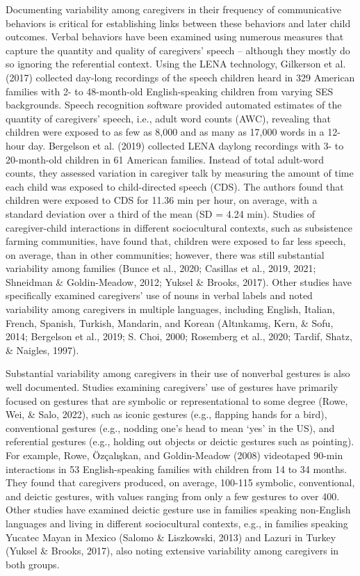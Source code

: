\documentclass[
  man,mask,floatsintext]{apa6}
\begin{document}
Documenting variability among caregivers in their frequency of communicative behaviors is critical for establishing links between these behaviors and later child outcomes. Verbal behaviors have been examined using numerous measures that capture the quantity and quality of caregivers' speech -- although they mostly do so ignoring the referential context. Using the LENA technology, Gilkerson et al. (2017) collected day-long recordings of the speech children heard in 329 American families with 2- to 48-month-old English-speaking children from varying SES backgrounds. Speech recognition software provided automated estimates of the quantity of caregivers' speech, i.e., adult word counts (AWC), revealing that children were exposed to as few as 8,000 and as many as 17,000 words in a 12-hour day. Bergelson et al. (2019) collected LENA daylong recordings with 3- to 20-month-old children in 61 American families. Instead of total adult-word counts, they assessed variation in caregiver talk by measuring the amount of time each child was exposed to child-directed speech (CDS). The authors found that children were exposed to CDS for 11.36 min per hour, on average, with a standard deviation over a third of the mean (SD = 4.24 min). Studies of caregiver-child interactions in different sociocultural contexts, such as subsistence farming communities, have found that, children were exposed to far less speech, on average, than in other communities; however, there was still substantial variability among families (Bunce et al., 2020; Casillas et al., 2019, 2021; Shneidman \& Goldin-Meadow, 2012; Yuksel \& Brooks, 2017). Other studies have specifically examined caregivers' use of nouns in verbal labels and noted variability among caregivers in multiple languages, including English, Italian, French, Spanish, Turkish, Mandarin, and Korean (Altınkamış, Kern, \& Sofu, 2014; Bergelson et al., 2019; S. Choi, 2000; Rosemberg et al., 2020; Tardif, Shatz, \& Naigles, 1997).

Substantial variability among caregivers in their use of nonverbal gestures is also well documented. Studies examining caregivers' use of gestures have primarily focused on gestures that are symbolic or representational to some degree (Rowe, Wei, \& Salo, 2022), such as iconic gestures (e.g., flapping hands for a bird), conventional gestures (e.g., nodding one's head to mean `yes' in the US), and referential gestures (e.g., holding out objects or deictic gestures such as pointing). For example, Rowe, Özçalışkan, and Goldin-Meadow (2008) videotaped 90-min interactions in 53 English-speaking families with children from 14 to 34 months. They found that caregivers produced, on average, 100-115 symbolic, conventional, and deictic gestures, with values ranging from only a few gestures to over 400. Other studies have examined deictic gesture use in families speaking non-English languages and living in different sociocultural contexts, e.g., in families speaking Yucatec Mayan in Mexico (Salomo \& Liszkowski, 2013) and Lazuri in Turkey (Yuksel \& Brooks, 2017), also noting extensive variability among caregivers in both groups.
\end{document}
